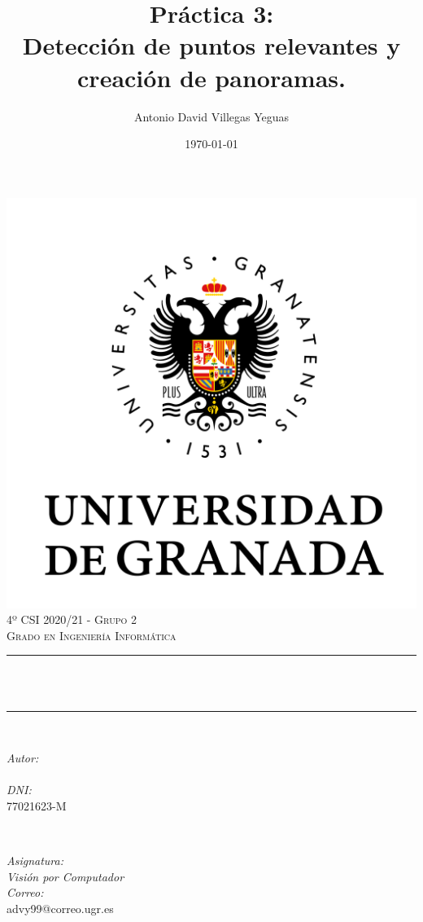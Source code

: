 \documentclass[12pt, spanish]{article}
\title{Práctica 3:\\
Detección de puntos relevantes y creación de panoramas.\hspace{0.05cm} }
\author{Antonio David Villegas Yeguas}
\date{\today}
\makeatletter
\let\thetitle\@title
\let\theauthor\@author
\makeatother
\begin{document}

\begin{titlepage}
    \centering
    \vspace*{0.3 cm}
    \includegraphics[scale = 0.50]{ugr.png}\\[0.7 cm]
    \textsc{\large 4º CSI 2020/21 - Grupo 2}\\[0.5 cm]
    \textsc{\large Grado en Ingeniería Informática}\\[0.5 cm]
    \rule{\linewidth}{0.2 mm} \\[0.2 cm]
    { \huge \bfseries \thetitle}\\
    \rule{\linewidth}{0.2 mm} \\[1 cm]

    \begin{minipage}{0.4\textwidth}
        \begin{flushleft} \large
            \emph{Autor:}\\
            \theauthor\\
			 \emph{DNI:}\\
            77021623-M
            \end{flushleft}
            \end{minipage}~
            \begin{minipage}{0.4\textwidth}
            \begin{flushright} \large
            \emph{Asignatura: \\
            Visión por Computador}   \\
            \emph{Correo:}\\
            advy99@correo.ugr.es
        \end{flushright}
    \end{minipage}\\[0.5cm]


\end{titlepage}
\end{document}

